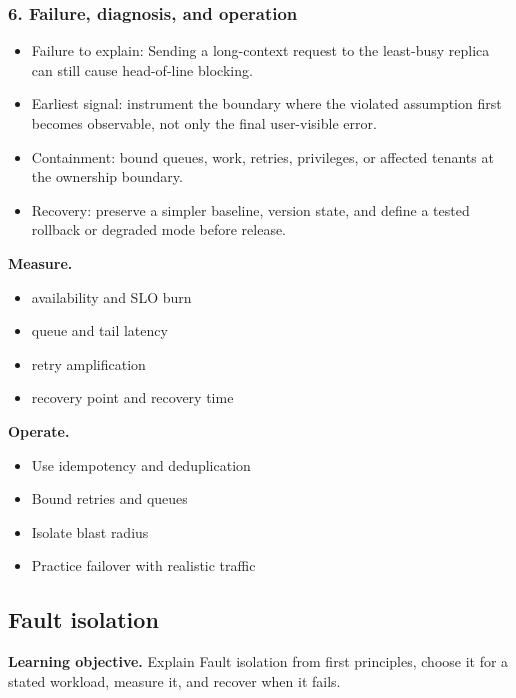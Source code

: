 \subsubsection*{6. Failure, diagnosis, and operation}
\begin{itemize}
\item Failure to explain: Sending a long-context request to the least-busy replica can still cause head-of-line blocking.
\item Earliest signal: instrument the boundary where the violated assumption first becomes observable, not only the final user-visible error.
\item Containment: bound queues, work, retries, privileges, or affected tenants at the ownership boundary.
\item Recovery: preserve a simpler baseline, version state, and define a tested rollback or degraded mode before release.
\end{itemize}
\textbf{Measure.}\begin{itemize}
\item availability and SLO burn
\item queue and tail latency
\item retry amplification
\item recovery point and recovery time
\end{itemize}
\textbf{Operate.}\begin{itemize}
\item Use idempotency and deduplication
\item Bound retries and queues
\item Isolate blast radius
\item Practice failover with realistic traffic
\end{itemize}
\subsection{Fault isolation}
\textbf{Learning objective.} Explain Fault isolation from first principles, choose it for a stated workload, measure it, and recover when it fails.

